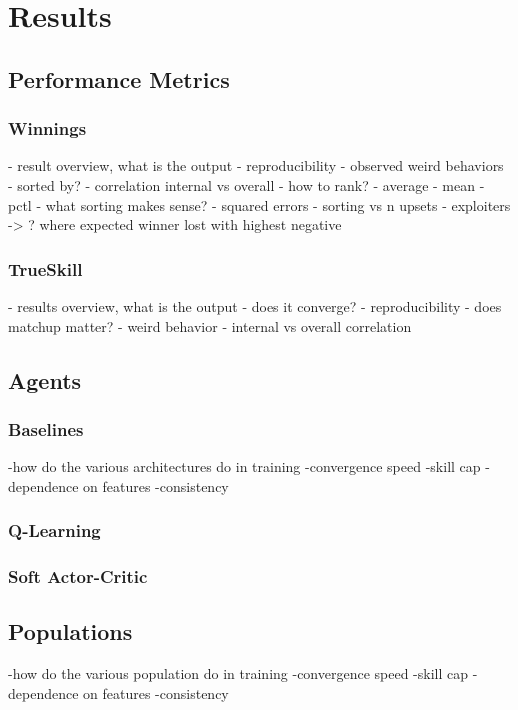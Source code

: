 \chapter{Results}

\section{Performance Metrics}

\subsection{Winnings}
- result overview, what is the output
- reproducibility
- observed weird behaviors
- sorted by?
- correlation internal vs overall
- how to rank?
 - average
 - mean
 - pctl
- what sorting makes sense?
 - squared errors
- sorting vs n upsets
- exploiters -> ? where expected winner lost with highest negative


\subsection{TrueSkill}
- results overview, what is the output
- does it converge?
- reproducibility
- does matchup matter?
- weird behavior
- internal vs overall correlation

\section{Agents}

\subsection{Baselines}

-how do the various architectures do in training
    -convergence speed
    -skill cap
    -dependence on features
    -consistency

\subsection{Q-Learning}

\subsection{Soft Actor-Critic}


\section{Populations}
-how do the various population do in training
    -convergence speed
    -skill cap
    -dependence on features
    -consistency

